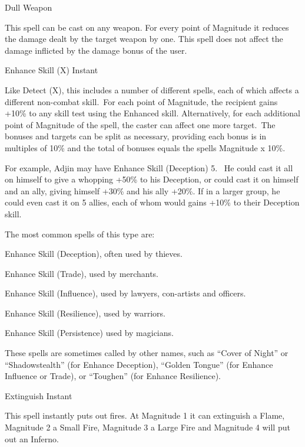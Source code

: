 \begin{rpg-spell}
{Dull Weapon}
{}

This spell can be cast on any weapon. For every point of Magnitude it reduces the damage dealt by the target weapon by one. This spell does not affect the damage inflicted by the damage bonus of the user.
\end{rpg-spell}


\begin{rpg-spell}
{Enhance Skill (X)}
{Instant}

Like Detect (X), this includes a number of different spells, each of which affects a different non-combat skill. For each point of Magnitude, the recipient gains +10\% to any skill test using the Enhanced skill.  Alternatively, for each additional point of Magnitude of the spell, the caster can affect one more target. The bonuses and targets can be split as necessary, providing each bonus is in multiples of 10\% and the total of bonuses equals the spells Magnitude x 10\%.

For example, Adjin may have Enhance Skill (Deception) 5.  He could cast it all on himself to give a whopping +50\% to his Deception, or could cast it on himself and an ally, giving himself +30\% and his ally +20\%. If in a larger group, he could even cast it on 5 allies, each of whom would gains +10\% to their Deception skill.

The most common spells of this type are:
\begin{rpg-list}
\item Enhance Skill (Deception), often used by thieves.
\item Enhance Skill (Trade), used by merchants.
\item Enhance Skill (Influence), used by lawyers, con-artists and officers.
\item Enhance Skill (Resilience), used by warriors.
\item Enhance Skill (Persistence) used by magicians.
\end{rpg-list}

These spells are sometimes called by other names, such as “Cover of Night” or “Shadowstealth” (for Enhance Deception), “Golden Tongue” (for Enhance Influence or Trade), or “Toughen” (for Enhance Resilience).
\end{rpg-spell}


\begin{rpg-spell}
{Extinguish}
{Instant}

This spell instantly puts out fires. At Magnitude 1 it can extinguish a Flame, Magnitude 2 a Small Fire, Magnitude 3 a Large Fire and Magnitude 4 will put out an Inferno.
\end{rpg-spell}


